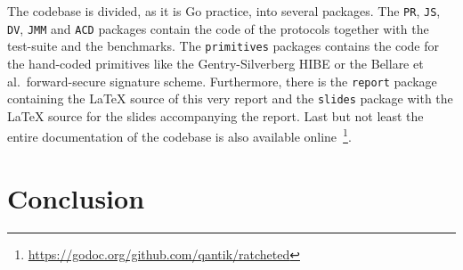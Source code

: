 \documentclass[11pt,a4paper,twoside,openright,bibliography=totoc]{scrbook}
\begin{document}
The codebase is divided, as it is Go practice, into several
packages. The \texttt{PR}, \texttt{JS}, \texttt{DV},
\texttt{JMM} and \texttt{ACD} packages contain
the code of the protocols together with the test-suite
and the benchmarks. The \texttt{primitives} packages
contains the code for the hand-coded primitives
like the Gentry-Silverberg HIBE or the Bellare
et al.~forward-secure signature scheme. Furthermore,
there is the \texttt{report} package containing
the \LaTeX{} source of this very report and the
\texttt{slides} package with the \LaTeX{} source
for the slides accompanying the report. Last but
not least the entire documentation of the
codebase is also available
online~\footnote{\url{https://godoc.org/github.com/qantik/ratcheted}}.




\chapter{Conclusion}
\label{chap:conclusion}





\listoffigures
\end{document}
